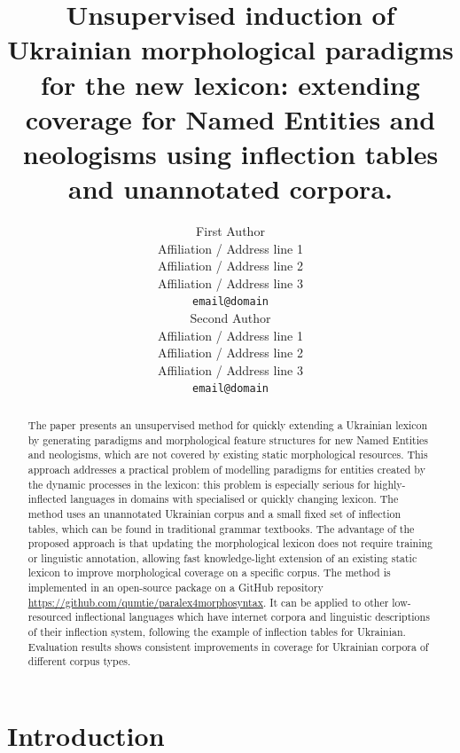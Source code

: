 \documentclass[11pt,a4paper]{article}
\title{Unsupervised induction of Ukrainian morphological paradigms for the new lexicon: extending coverage for Named Entities and neologisms using inflection tables and unannotated corpora.}
\author{First Author \\
  Affiliation / Address line 1 \\
  Affiliation / Address line 2 \\
  Affiliation / Address line 3 \\
  \texttt{email@domain} \\\And
  Second Author \\
  Affiliation / Address line 1 \\
  Affiliation / Address line 2 \\
  Affiliation / Address line 3 \\
  \texttt{email@domain} \\}
\date{}
\begin{document}
\maketitle
\begin{abstract}
	The paper presents an unsupervised method for quickly extending a Ukrainian lexicon by generating paradigms and morphological feature structures for new Named Entities and neologisms, which are not covered by existing static morphological resources. This approach addresses a practical problem of modelling paradigms for entities created by the dynamic processes in the lexicon: this problem is especially serious for highly-inflected languages in  domains with specialised or quickly changing lexicon. The method uses an unannotated Ukrainian corpus and a small fixed set of inflection tables, which can be found in traditional grammar textbooks. The advantage of the proposed approach is that updating the morphological lexicon does not require training or linguistic annotation, allowing fast knowledge-light extension of an existing static lexicon to improve morphological coverage on a specific corpus. The method is implemented in an open-source package on a GitHub repository \url{https://github.com/qumtie/paralex4morphosyntax}. It can be applied to other low-resourced inflectional languages which have internet corpora and linguistic descriptions of their inflection system, following the example of inflection tables for Ukrainian. Evaluation results shows consistent improvements in coverage for Ukrainian corpora of different corpus types.
	

\end{abstract}


\section{Introduction}
\end{document}
